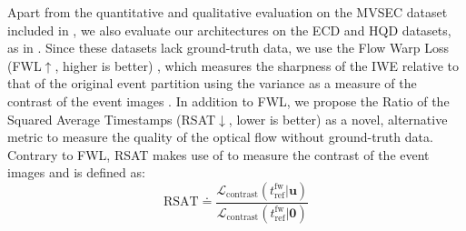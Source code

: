 Apart from the quantitative and qualitative evaluation on the MVSEC dataset \cite{zhu2018multivehicle} included in , we also evaluate our architectures on the ECD \cite{mueggler2017eventcamera} and HQD \cite{stoffregen2020reducing} datasets, as in \cite{paredes-valles2021back,stoffregen2020reducing}. Since these datasets lack ground-truth data, we use the Flow Warp Loss (FWL$\uparrow$, higher is better) \cite{stoffregen2020reducing}, which measures the sharpness of the IWE relative to that of the original event partition using the variance as a measure of the contrast of the event images \cite{gallego2019focus}. In addition to FWL, we propose the Ratio of the Squared Average Timestamps (RSAT$\downarrow$, lower is better) as a novel, alternative metric to measure the quality of the optical flow without ground-truth data. Contrary to FWL, RSAT makes use of  to measure the contrast of the event images and is defined as:
\begin{equation}
	\text{RSAT} \doteq \frac{\mathcal{L}_{\text{contrast}}(t_{\text{ref}}^{\text{fw}}| \boldsymbol{u})}{\mathcal{L}_{\text{contrast}}(t_{\text{ref}}^{\text{fw}}|\boldsymbol{0})}
\end{equation}

